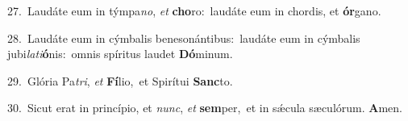 {\numbfont\textcolor{\numbcolor}{27.}}~Laudáte eum in týmpa\-\textit{no}\-, \textit{et} \textbf{cho}\-ro:~\star laudáte eum in chordis, et \textbf{ór}\-gano.\par
{\numbfont\textcolor{\numbcolor}{28.}}~Laudáte eum in cýmbalis benesonántibus:~\dagger laudáte eum in cýmbalis jubi\-\textit{la}\-\textit{ti}\textbf{ó}nis:~\star omnis spíritus laudet \textbf{Dó}\-minum.\par
{\numbfont\textcolor{\numbcolor}{29.}}~Glória Pa\-\textit{tri}\-, \textit{et} \textbf{Fí}\-lio,~\star et Spirítui \textbf{Sanc}\-to.\par
{\numbfont\textcolor{\numbcolor}{30.}}~Sicut erat in princípio, et \textit{nunc}\-, \textit{et} \textbf{sem}\-per,~\star et in sǽcula sæculórum. \textbf{A}\-men.\par
